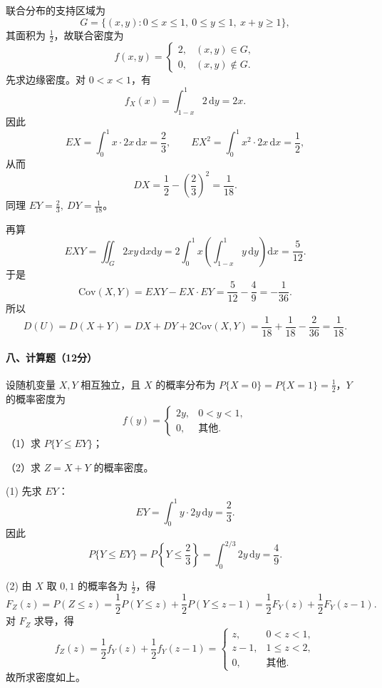 \documentclass[lang=cn,11pt]{elegantbook}
\begin{document}
\begin{solution}
\par
联合分布的支持区域为
\[
  G=\{(x,y):0\le x\le1,\ 0\le y\le1,\ x+y\ge1\},
\]
其面积为 \(\frac12\)，故联合密度为
\[
  f(x,y)=
  \begin{cases}
    2, & (x,y)\in G,\\
    0, & (x,y)\notin G.
  \end{cases}
\]
先求边缘密度。对 \(0<x<1\)，有
\[
  f_X(x)=\int_{1-x}^1 2\,\mathrm{d}y=2x.
\]
因此
\[
  EX=\int_0^1 x\cdot2x\,\mathrm{d}x=\frac23,\qquad
  EX^2=\int_0^1 x^2\cdot2x\,\mathrm{d}x=\frac12,
\]
从而
\[
  DX=\frac12-\left(\frac23\right)^2=\frac1{18}.
\]
同理 \(EY=\frac23,\ DY=\frac1{18}\)。

再算
\[
  EXY=\iint_G 2xy\,\mathrm{d}x\mathrm{d}y
  =2\int_0^1 x\left(\int_{1-x}^1 y\,\mathrm{d}y\right)\mathrm{d}x
  =\frac{5}{12}.
\]
于是
\[
  \mathrm{Cov}(X,Y)=EXY-EX\cdot EY
  =\frac{5}{12}-\frac49=-\frac1{36}.
\]
所以
\[
  D(U)=D(X+Y)=DX+DY+2\mathrm{Cov}(X,Y)
  =\frac1{18}+\frac1{18}-\frac{2}{36}
  =\frac1{18}.
\]
\end{solution}

\paragraph*{八、计算题（12分）}
\begin{exercise}
\par
设随机变量 \(X,Y\) 相互独立，且 \(X\) 的概率分布为 \(P\{X=0\}=P\{X=1\}=\frac12\)，\(Y\) 的概率密度为
\[
f(y)=
\begin{cases}
2y, & 0<y<1,\\
0, & \text{其他}.
\end{cases}
\]
（1）求 \(P\{Y\le EY\}\)；

（2）求 \(Z=X+Y\) 的概率密度。
\end{exercise}

\begin{solution}
\par
(1) 先求 \(EY\)：
\[
  EY=\int_0^1 y\cdot2y\,\mathrm{d}y=\frac23.
\]
因此
\[
  P\{Y\le EY\}=P\!\left\{Y\le\frac23\right\}
  =\int_0^{2/3}2y\,\mathrm{d}y=\frac49.
\]

(2) 由 \(X\) 取 \(0,1\) 的概率各为 \(\frac12\)，得
\[
  F_Z(z)=P(Z\le z)
  =\frac12P(Y\le z)+\frac12P(Y\le z-1)
  =\frac12F_Y(z)+\frac12F_Y(z-1).
\]
对 \(F_Z\) 求导，得
\[
  f_Z(z)=\frac12f_Y(z)+\frac12f_Y(z-1)
  =
  \begin{cases}
    z, & 0<z<1,\\
    z-1, & 1\le z<2,\\
    0, & \text{其他}.
  \end{cases}
\]
故所求密度如上。
\end{solution}
\end{document}
